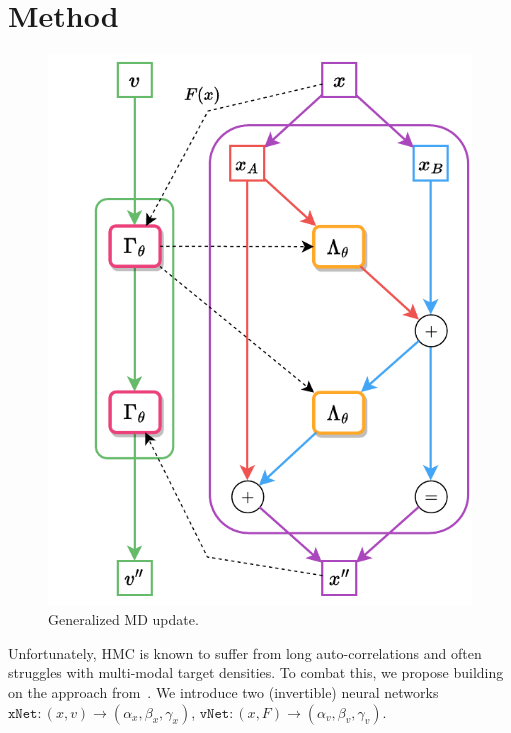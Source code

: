 \documentclass[a4paper,11pt]{article}
\begin{document}
\section{Method}
\label{sec:method}
%
\begin{figure}
    \begin{center}
        \caption{\label{fig:lf-layer}Generalized MD update.} 
        \includegraphics[width=\linewidth]{assets/leapfrog-layer.drawio.pdf}
  \end{center}
\end{figure}
%
Unfortunately, HMC is known to suffer from long auto-correlations and often
struggles with multi-modal target densities.
%
To combat this, we propose building on the approach from~\cite{foreman_learning_2019,foreman_deep_2021,foreman_leapfroglayers_2022}. 
%
We introduce two (invertible) neural networks $\texttt{xNet}: (x, v) \rightarrow (\alpha_{x}, \beta_{x}, \gamma_{x})$, $\texttt{vNet}: (x, F) \rightarrow (\alpha_{v}, \beta_{v}, \gamma_{v})$.
%
%
\end{document}
